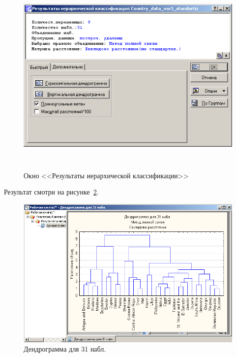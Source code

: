\begin{figure}[!h]
  \centering

  \includegraphics[height=10cm]
  {inc/cars_my/var5__1_5.PNG}

  \caption{Окно <<Результаты иерархической классификации>>}
  \label{fig:var5__1_5}
\end{figure}

\newpage

Результат смотри на рисунке~\ref{fig:var5__1_6}.

\begin{figure}[!h]
  \centering

  \includegraphics[width=17cm]
  {inc/cars_my/var5__1_6.PNG}

  \caption{Дендрограмма для 31 набл.}
  \label{fig:var5__1_6}
\end{figure}

